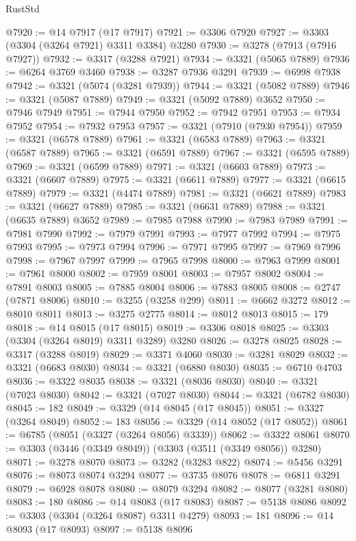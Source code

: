 \begin{lexlean}{RustStd}
\begin{coremodule}
{\begin{coremodule}
{{{{{{{{{{{{{{{{{{{{{{{{{{{{{{{{{@7920 := @14 @7917 (@17 @7917)
@7921 := @3306 @7920
@7927 := @3303 (@3304 (@3264 @7921) @3311 @3384) @3280
@7930 := @3278 (@7913 (@7916 @7927))
@7932 := @3317 (@3288 @7921)
@7934 := @3321 (@5065 @7889)
@7936 := @6264 @3769 @3460
@7938 := @3287 @7936 @3291
@7939 := @6998 @7938
@7942 := @3321 (@5074 (@3281 @7939))
@7944 := @3321 (@5082 @7889)
@7946 := @3321 (@5087 @7889)
@7949 := @3321 (@5092 @7889) @3652
@7950 := @7946 @7949
@7951 := @7944 @7950
@7952 := @7942 @7951
@7953 := @7934 @7952
@7954 := @7932 @7953
@7957 := @3321 (@7910 (@7930 @7954))
@7959 := @3321 (@6578 @7889)
@7961 := @3321 (@6583 @7889)
@7963 := @3321 (@6587 @7889)
@7965 := @3321 (@6591 @7889)
@7967 := @3321 (@6595 @7889)
@7969 := @3321 (@6599 @7889)
@7971 := @3321 (@6603 @7889)
@7973 := @3321 (@6607 @7889)
@7975 := @3321 (@6611 @7889)
@7977 := @3321 (@6615 @7889)
@7979 := @3321 (@4474 @7889)
@7981 := @3321 (@6621 @7889)
@7983 := @3321 (@6627 @7889)
@7985 := @3321 (@6631 @7889)
@7988 := @3321 (@6635 @7889) @3652
@7989 := @7985 @7988
@7990 := @7983 @7989
@7991 := @7981 @7990
@7992 := @7979 @7991
@7993 := @7977 @7992
@7994 := @7975 @7993
@7995 := @7973 @7994
@7996 := @7971 @7995
@7997 := @7969 @7996
@7998 := @7967 @7997
@7999 := @7965 @7998
@8000 := @7963 @7999
@8001 := @7961 @8000
@8002 := @7959 @8001
@8003 := @7957 @8002
@8004 := @7891 @8003
@8005 := @7885 @8004
@8006 := @7883 @8005
@8008 := @2747 (@7871 @8006)
@8010 := @3255 (@3258 @299)
@8011 := @6662 @3272
@8012 := @8010 @8011
@8013 := @3275 @2775
@8014 := @8012 @8013
@8015 := 179
@8018 := @14 @8015 (@17 @8015)
@8019 := @3306 @8018
@8025 := @3303 (@3304 (@3264 @8019) @3311 @3289) @3280
@8026 := @3278 @8025
@8028 := @3317 (@3288 @8019)
@8029 := @3371 @4060
@8030 := @3281 @8029
@8032 := @3321 (@6683 @8030)
@8034 := @3321 (@6880 @8030)
@8035 := @6710 @4703
@8036 := @3322 @8035
@8038 := @3321 (@8036 @8030)
@8040 := @3321 (@7023 @8030)
@8042 := @3321 (@7027 @8030)
@8044 := @3321 (@6782 @8030)
@8045 := 182
@8049 := @3329 (@14 @8045 (@17 @8045))
@8051 := @3327 (@3264 @8049)
@8052 := 183
@8056 := @3329 (@14 @8052 (@17 @8052))
@8061 := @6785 (@8051 (@3327 (@3264 @8056) @3339))
@8062 := @3322 @8061
@8070 := @3303 (@3446 (@3349 @8049)) (@3303 (@3511 (@3349 @8056)) @3280)
@8071 := @3278 @8070
@8073 := @3282 (@3283 @822)
@8074 := @5456 @3291
@8076 := @8073 @8074 @3294
@8077 := @3735 @8076
@8078 := @6811 @3291
@8079 := @6928 @8078
@8080 := @8079 @3294
@8082 := @8077 (@3281 @8080)
@8083 := 180
@8086 := @14 @8083 (@17 @8083)
@8087 := @5138 @8086
@8092 := @3303 (@3304 (@3264 @8087) @3311 @4279)
@8093 := 181
@8096 := @14 @8093 (@17 @8093)
@8097 := @5138 @8096
}}}}}}}}}}}}}}}}}}}}}}}}}}}}}}}}}
\end{coremodule}}
\end{coremodule}
\end{lexlean}
